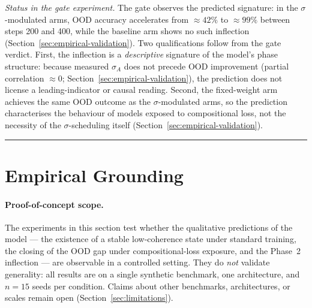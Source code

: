 \documentclass{article}
\theoremstyle{definition}
\begin{document}
\noindent\emph{Status in the gate experiment.} The gate observes the
predicted signature: in the $\sigma$-modulated arms, OOD accuracy
accelerates from $\approx 42\%$ to $\approx 99\%$ between steps 200 and
400, while the baseline arm shows no such inflection
(Section~\ref{sec:empirical-validation}). Two qualifications follow
from the gate verdict. First, the inflection is a \emph{descriptive}
signature of the model's phase structure: because measured $\sigma_A$
does not precede OOD improvement (partial correlation $\approx 0$;
Section~\ref{sec:empirical-validation}), the prediction does not license
a leading-indicator or causal reading. Second, the fixed-weight arm
achieves the same OOD outcome as the $\sigma$-modulated arms, so the
prediction characterises the behaviour of models exposed to
compositional loss, not the necessity of the $\sigma$-scheduling itself
(Section~\ref{sec:empirical-validation}).

\noindent\rule{\linewidth}{0.4pt}

\section{Empirical Grounding}\label{sec:empirical}

\paragraph*{Proof-of-concept scope.}
The experiments in this section test whether the qualitative
predictions of the model --- the existence of a stable low-coherence
state under standard training, the closing of the OOD gap under
compositional-loss exposure, and the Phase~2 inflection --- are
observable in a controlled setting. They do \emph{not} validate
generality: all results are on a single synthetic benchmark, one
architecture, and $n = 15$ seeds per condition. Claims about other
benchmarks, architectures, or scales remain open
(Section~\ref{sec:limitations}).
\end{document}
